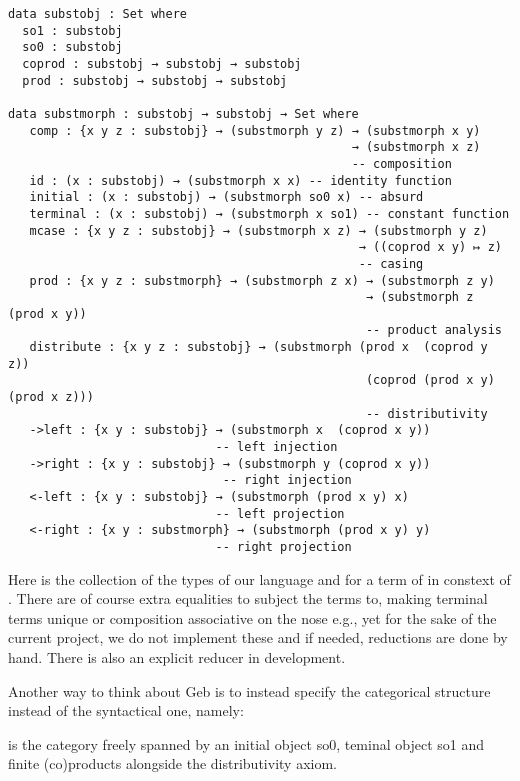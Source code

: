 \begin{verbatim}
data substobj : Set where
  so1 : substobj
  so0 : substobj
  coprod : substobj → substobj → substobj
  prod : substobj → substobj → substobj

data substmorph : substobj → substobj → Set where
   comp : {x y z : substobj} → (substmorph y z) → (substmorph x y) 
                                                → (substmorph x z) 
                                                -- composition
   id : (x : substobj) → (substmorph x x) -- identity function
   initial : (x : substobj) → (substmorph so0 x) -- absurd 
   terminal : (x : substobj) → (substmorph x so1) -- constant function
   mcase : {x y z : substobj} → (substmorph x z) → (substmorph y z) 
                                                 → ((coprod x y) ↦ z)
                                                 -- casing 
   prod : {x y z : substmorph} → (substmorph z x) → (substmorph z y) 
                                                  → (substmorph z (prod x y))
                                                  -- product analysis
   distribute : {x y z : substobj} → (substmorph (prod x  (coprod y z)) 
                                                  (coprod (prod x y) (prod x z)))
                                                  -- distributivity
   ->left : {x y : substobj} → (substmorph x  (coprod x y))
                             -- left injection
   ->right : {x y : substobj} → (substmorph y (coprod x y))
                              -- right injection
   <-left : {x y : substobj} → (substmorph (prod x y) x)
                             -- left projection
   <-right : {x y : substmorph} → (substmorph (prod x y) y) 
                             -- right projection
\end{verbatim}

Here \gebobj is the collection of the types of our language and \colorbox{gray!50}{} for a term of \colorbox{gray!50}{} in constext of \colorbox{gray!50}{}. There are of course extra equalities to subject the terms to, making terminal terms unique or composition associative on the nose e.g., yet for the sake of the current project, we do not implement these and if needed, reductions are done by hand. There is also an explicit reducer in development.

Another way to think about Geb is to instead specify the categorical structure instead of the syntactical one, namely:
\begin{definition}
 is the category freely spanned by an initial object so0, teminal object so1 and finite (co)products alongside the distributivity axiom.
\end{definition}

